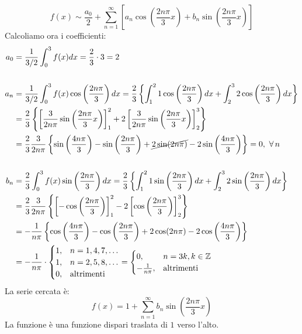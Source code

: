 \FloatBarrier

\begin{equation*}
f(x) \sim \frac{a_{0}}{2} + \sum\limits^{\infty}_{n = 1}\left[ a_{n}\cos\left(\frac{2n\pi}{3} x\right) + b_{n}\sin\left(\frac{2n\pi}{3} x\right)\right]
\end{equation*}
Calcoliamo ora i coefficienti:
\begin{align*}
a_{0} & = \frac{1}{3/2}\int^{3}_{0} f(x)dx = \frac{2}{3} \cdot 3 = 2\\
 & \\
a_{n} & = \frac{1}{3/2}\int^{3}_{0} f(x)\cos\left(\frac{2n\pi}{3}\right) dx = \frac{2}{3}\left\{\int^{2}_{1} 1\cos\left(\frac{2n\pi}{3}\right) dx + \int^{3}_{2} 2\cos\left(\frac{2n\pi}{3}\right) dx\right\}\\
 & = \frac{2}{3}\left\{\left[\frac{3}{2n\pi}\sin\left(\frac{2n\pi}{3} x\right)\right]^{2}_{1} + 2\left[\frac{3}{2n\pi}\sin\left(\frac{2n\pi}{3} x\right)\right]^{3}_{2}\right\}\\
 & = \frac{2}{3}\frac{3}{2n\pi}\left\{\sin\left(\frac{4n\pi}{3}\right) - \sin\left(\frac{2n\pi}{3}\right) + \cancel{2\sin(2n\pi)} - 2\sin\left(\frac{4n\pi}{3}\right)\right\} = 0, \ \forall n\\
 & \\
b_{n} & = \frac{2}{3}\int^{3}_{0} f(x)\sin\left(\frac{2n\pi}{3}\right) dx = \frac{2}{3}\left\{\int^{2}_{1} 1\sin\left(\frac{2n\pi}{3}\right) dx + \int^{3}_{2} 2\sin\left(\frac{2n\pi}{3}\right) dx\right\}\\
 & = \frac{2}{3}\frac{3}{2n\pi}\left\{\left[ - \cos\left(\frac{2n\pi}{3}\right)\right]^{2}_{1} - 2\left[\cos\left(\frac{2n\pi}{3}\right)\right]^{3}_{2}\right\}\\
 & = - \frac{1}{n\pi}\left\{\cos\left(\frac{4n\pi}{3}\right) - \cos\left(\frac{2n\pi}{3}\right) + 2\cos(2n\pi) - 2\cos\left(\frac{4n\pi}{3}\right)\right\}\\
 & = - \frac{1}{n\pi} \cdot
\begin{cases}
1, & n = 1, 4, 7, \dotsc \\
1, & n = 2, 5, 8, \dotsc \\
0, & \text{altrimenti}
\end{cases} =
\begin{cases}
0, & n = 3k, k\in \ZZ \\
- \frac{1}{n\pi}, & \text{altrimenti}
\end{cases}
\end{align*}
La serie cercata è:
\begin{equation*}
f(x) = 1 + \sum^{\infty}_{n = 1} b_{n}\sin\left(\frac{2n\pi}{3} x\right)
\end{equation*}
La funzione è una funzione dispari traslata di $1$ verso l'alto.
\Soluzione

